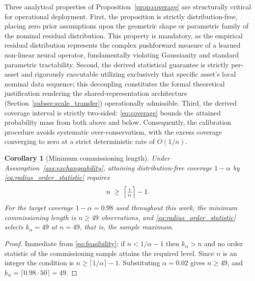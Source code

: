 \documentclass[a4paper]{cas-sc}
\newtheorem{corollary}{Corollary}
\begin{document}
Three analytical properties of Proposition~\ref{prop:coverage} are structurally critical for operational deployment. First, the proposition is strictly distribution-free, placing zero prior assumptions upon the geometric shape or parametric family of the nominal residual distribution. This property is mandatory, as the empirical residual distribution represents the complex pushforward measure of a learned non-linear neural operator, fundamentally violating Gaussianity and standard parametric tractability. Second, the derived statistical guarantee is strictly per-asset and rigorously executable utilizing exclusively that specific asset's local nominal data sequence; this decoupling constitutes the formal theoretical justification rendering the shared-representation architecture (Section~\ref{subsec:scale_transfer}) operationally admissible. Third, the derived coverage interval is strictly two-sided: \eqref{eq:coverage} bounds the attained probability mass from both above and below. Consequently, the calibration procedure avoids systematic over-conservatism, with the excess coverage converging to zero at a strict deterministic rate of \(O(1/n)\).

\begin{corollary}[Minimum commissioning length]
\label{cor:min_commissioning}
Under Assumption~\ref{ass:exchangeability}, attaining distribution-free
coverage \(1-\alpha\) by \eqref{eq:radius_order_statistic} requires
\begin{equation}
n \;\ge\; \Bigl\lceil \tfrac{1}{\alpha} \Bigr\rceil - 1 .
\label{eq:min_n}
\end{equation}
For the target coverage \(1-\alpha=0.98\) used throughout this work, the
minimum commissioning length is \(n\ge 49\) observations, and
\eqref{eq:radius_order_statistic} selects \(k_\alpha=49\) at \(n=49\), that
is, the sample maximum.
\end{corollary}

\begin{proof}
Immediate from \eqref{eq:feasibility}: if \(n<1/\alpha-1\) then
\(k_\alpha>n\) and no order statistic of the commissioning sample attains
the required level. Since \(n\) is an integer the condition is
\(n\ge\lceil 1/\alpha\rceil-1\). Substituting \(\alpha=0.02\) gives
\(n\ge 49\), and \(k_\alpha=\lceil 0.98\cdot 50\rceil = 49\).
\end{proof}
\end{document}

